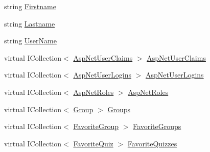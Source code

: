\begin{DoxyCompactItemize}
\item 
string \hyperlink{class_website_1_1_asp_net_users_a57c852b3aab29948c69ea8711631019e}{Firstname}
\item 
string \hyperlink{class_website_1_1_asp_net_users_aef6d42730d88efe9b9cbc205c2818201}{Lastname}
\item 
string \hyperlink{class_website_1_1_asp_net_users_ada29c49ac9d4f6a95291c007d9165701}{User\+Name}
\item 
virtual I\+Collection$<$ \hyperlink{class_website_1_1_asp_net_user_claims}{Asp\+Net\+User\+Claims} $>$ \hyperlink{class_website_1_1_asp_net_users_a9ae09b5fafc0417bcad82a2ec7b014e1}{Asp\+Net\+User\+Claims}
\item 
virtual I\+Collection$<$ \hyperlink{class_website_1_1_asp_net_user_logins}{Asp\+Net\+User\+Logins} $>$ \hyperlink{class_website_1_1_asp_net_users_a67ac14091100408a70ae806077e49d1f}{Asp\+Net\+User\+Logins}
\item 
virtual I\+Collection$<$ \hyperlink{class_website_1_1_asp_net_roles}{Asp\+Net\+Roles} $>$ \hyperlink{class_website_1_1_asp_net_users_a92a3cc1c78e0bde5ff926a55d90c0223}{Asp\+Net\+Roles}
\item 
virtual I\+Collection$<$ \hyperlink{class_website_1_1_models_1_1_group}{Group} $>$ \hyperlink{class_website_1_1_asp_net_users_aaebce63df46185a8990b794e3d5c17a4}{Groups}
\item 
virtual I\+Collection$<$ \hyperlink{class_website_1_1_models_1_1_favorite_group}{Favorite\+Group} $>$ \hyperlink{class_website_1_1_asp_net_users_a5ad2e645c652cf4d75b38db152b13290}{Favorite\+Groups}
\item 
virtual I\+Collection$<$ \hyperlink{class_website_1_1_models_1_1_favorite_quiz}{Favorite\+Quiz} $>$ \hyperlink{class_website_1_1_asp_net_users_ae047531ab98f7ace108ddb482f0112c8}{Favorite\+Quizzes}
\end{DoxyCompactItemize}



